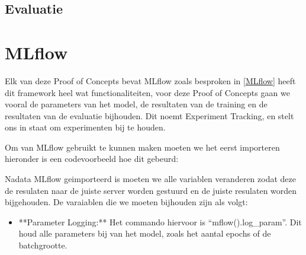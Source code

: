 \subsection{Evaluatie}

\section*{MLflow}
Elk van deze Proof of Concepts bevat MLflow zoals besproken in \ref*{MLflow} heeft dit framework heel wat functionaliteiten, voor deze Proof of Concepts gaan we vooral de parameters van het model, de resultaten van de training en de resultaten van de evaluatie bijhouden.
Dit noemt Experiment Tracking, en stelt ons in staat om experimenten bij te houden.

Om van MLflow gebruikt te kunnen maken moeten we het eerst importeren hieronder is een codevoorbeeld hoe dit gebeurd:

Nadata MLflow geimporteerd is moeten we alle variablen veranderen zodat deze de resulaten naar de juiste server worden gestuurd en de juiste resulaten worden bijgehouden.
De varaiablen die we moeten bijhouden zijn als volgt:

\begin{itemize}
    \item **Parameter Logging:** Het commando hiervoor is ``mflow().log_param''. Dit houd alle parameters bij van het model, zoals het aantal epochs of de batchgrootte.
\end{itemize}




